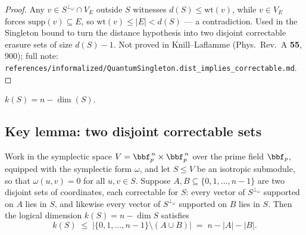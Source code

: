 \begin{proof}
\leanok
Any $v \in S^{\perp_\omega} \cap V_E$ outside $S$ witnesses
$d(S) \le \mathrm{wt}(v)$, while $v \in V_E$ forces
$\mathrm{supp}(v) \subseteq E$, so $\mathrm{wt}(v) \le |E| < d(S)$ --- a
contradiction.  Used in the Singleton bound to turn the distance hypothesis
into two disjoint correctable erasure sets of size $d(S)-1$.  Not proved in
Knill--Laflamme (Phys.\ Rev.\ A \textbf{55}, 900); full note:
\texttt{references/informalized/QuantumSingleton.dist\_implies\_correctable.md}.
\end{proof}

\begin{definition}
\label{code_k}
\leanok
{}
$k(S) = n - \dim(S)$.
\end{definition}

\subsection{Key lemma: two disjoint correctable sets}

\begin{lemma}
\label{two_disjoint_correctable_sets_bound_logical_dimension}
\leanok
{}
Work in the symplectic space $V = \bbf_p^{\,n} \times \bbf_p^{\,n}$ over the prime field
$\bbf_p$, equipped with the symplectic form $\omega$, and let $S \le V$ be an isotropic
submodule, so that $\omega(u,v) = 0$ for all $u, v \in S$. Suppose $A, B \subseteq \{0,
1, \dots, n-1\}$ are two disjoint sets of coordinates, each correctable for $S$: every
vector of $S^{\perp_\omega}$ supported on $A$ lies in $S$, and likewise every vector of
$S^{\perp_\omega}$ supported on $B$ lies in $S$. Then the logical dimension $k(S) = n -
\dim S$ satisfies
\[
k(S) \;\le\; \bigl|\{0, 1, \dots, n-1\} \setminus (A \cup B)\bigr| \;=\; n - |A| - |B|.
\]
\end{lemma}

